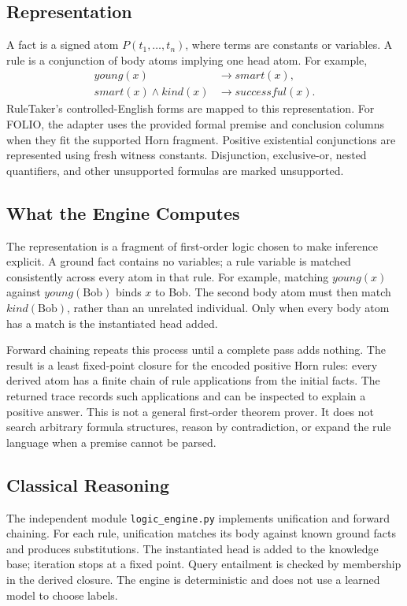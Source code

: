 \documentclass[10pt,twocolumn,letterpaper]{article}
\begin{document}
\subsection{Representation}
A fact is a signed atom $P(t_1,\ldots,t_n)$, where terms are constants or variables. A rule is a conjunction of body atoms implying one head atom. For example,
\begin{align*}
\mathit{young}(x) &\rightarrow \mathit{smart}(x),\\
\mathit{smart}(x) \land \mathit{kind}(x) &\rightarrow \mathit{successful}(x).
\end{align*}
RuleTaker's controlled-English forms are mapped to this representation. For FOLIO, the adapter uses the provided formal premise and conclusion columns when they fit the supported Horn fragment. Positive existential conjunctions are represented using fresh witness constants. Disjunction, exclusive-or, nested quantifiers, and other unsupported formulas are marked unsupported.

\subsection{What the Engine Computes}
The representation is a fragment of first-order logic chosen to make inference explicit. A ground fact contains no variables; a rule variable is matched consistently across every atom in that rule. For example, matching $\mathit{young}(x)$ against $\mathit{young}(\text{Bob})$ binds $x$ to Bob. The second body atom must then match $\mathit{kind}(\text{Bob})$, rather than an unrelated individual. Only when every body atom has a match is the instantiated head added.

Forward chaining repeats this process until a complete pass adds nothing. The result is a least fixed-point closure for the encoded positive Horn rules: every derived atom has a finite chain of rule applications from the initial facts. The returned trace records such applications and can be inspected to explain a positive answer. This is not a general first-order theorem prover. It does not search arbitrary formula structures, reason by contradiction, or expand the rule language when a premise cannot be parsed.

\subsection{Classical Reasoning}
The independent module \texttt{logic\_engine.py} implements unification and forward chaining. For each rule, unification matches its body against known ground facts and produces substitutions. The instantiated head is added to the knowledge base; iteration stops at a fixed point. Query entailment is checked by membership in the derived closure. The engine is deterministic and does not use a learned model to choose labels.
\end{document}
